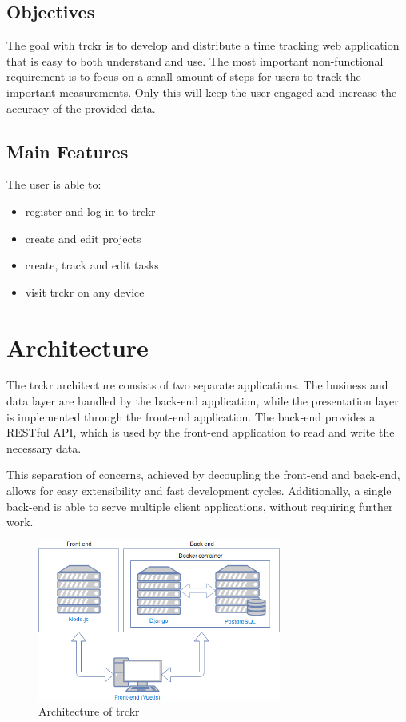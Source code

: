 \documentclass[bibliography=totoc, listof=totocnumbered]{scrartcl}
\begin{document}
\subsection{Objectives}
The goal with trckr is to develop and distribute a time tracking web application
that is easy to both understand and use. The most important non-functional
requirement is to focus on a small amount of steps for users to track the
important measurements. Only this will keep the user engaged and increase the
accuracy of the provided data.

\subsection{Main Features}
The user is able to:
\begin{itemize}
    \item register and log in to trckr
    \item create and edit projects
    \item create, track and edit tasks
    \item visit trckr on any device
\end{itemize}

\section{Architecture}
The trckr architecture consists of two separate applications. The business and
data layer are handled by the back-end application, while the presentation layer
is implemented through the front-end application. The back-end provides a
RESTful API, which is used by the front-end application to read and write the
necessary data.

This separation of concerns, achieved by decoupling the front-end and back-end,
allows for easy extensibility and fast development cycles. Additionally, a
single back-end is able to serve multiple client applications, without requiring
further work.

\begin{figure}[h]
    \includegraphics[width=8cm]{architecture}
    \caption{Architecture of trckr}
    \label{fig:architecture}
\end{figure}
\end{document}

